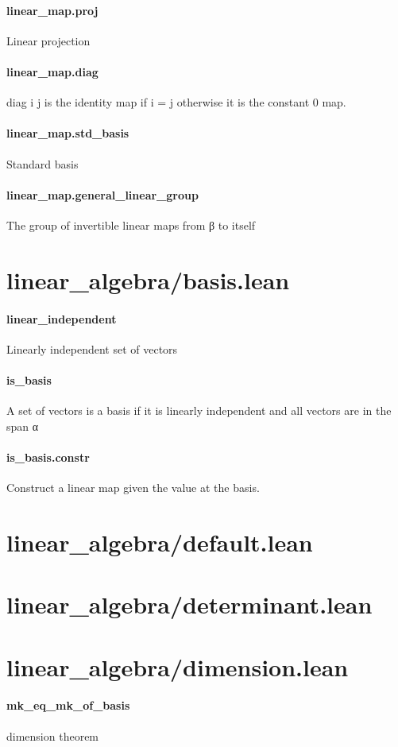 \documentclass{article}
\begin{document}
\paragraph{linear\_map.proj}
\par
Linear projection
\paragraph{linear\_map.diag}
\par
\colorbox[RGB]{253,246,227}{{{{\color[RGB]{101, 123, 131} diag i j }}}} is the identity map if 
\colorbox[RGB]{253,246,227}{{{{\color[RGB]{101, 123, 131} i  }}}{{{\color[RGB]{181, 137, 0} = }}}{{{\color[RGB]{101, 123, 131}  j }}}} otherwise it is the constant 0 map.
\paragraph{linear\_map.std\_basis}
\par
Standard basis
\paragraph{linear\_map.general\_linear\_group}
\par
The group of invertible linear maps from 
\colorbox[RGB]{253,246,227}{{{{\color[RGB]{101, 123, 131} β }}}} to itself
\section{linear\_algebra/basis.lean}\paragraph{linear\_independent}
\par
Linearly independent set of vectors
\paragraph{is\_basis}
\par
A set of vectors is a basis if it is linearly independent and all vectors are in the span α
\paragraph{is\_basis.constr}
\par
Construct a linear map given the value at the basis.
\section{linear\_algebra/default.lean}\section{linear\_algebra/determinant.lean}\section{linear\_algebra/dimension.lean}\paragraph{mk\_eq\_mk\_of\_basis}
\par
dimension theorem
\end{document}
